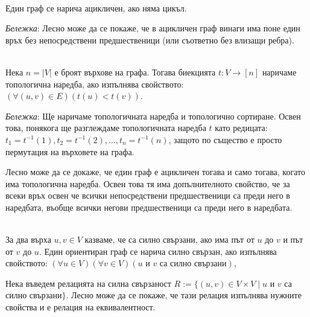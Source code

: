 \documentclass[12pt,twoside,a4paper]{article}
\begin{document}
	\begin{definition}~\\
		\indent Един граф се нарича ацикличен, ако няма цикъл.
		
		\textit{Бележка}: Лесно може да се покаже, че в ацикличен граф винаги има поне един връх без непосредствени предшественици (или съответно без влизащи ребра).
	\end{definition}
	
	\begin{definition}~\\
		\indent Нека $n=|V|$ е броят върхове на графа. Тогава биекцията $t\colon V \to [n]$ наричаме топологична наредба, ако изпълнява свойството: $(\forall (u,v) \in E)(t(u)<t(v))$.
		
		\textit{Бележка}: Ще наричаме топологичната наредба и топологично сортиране. Освен това, понякога ще разглеждаме топологичната наредба $t$ като редицата: $t_1 = t^{-1}(1), t_2 = t^{-1}(2), \dots, t_n = t^{-1}(n)$, защото по същество е просто пермутация на върховете на графа.
	\end{definition}
	
	Лесно може да се докаже, че един граф е ацикличен тогава и само тогава, когато има топологична наредба. Освен това тя има допълнителното свойство, че за всеки връх освен че всички непосредствени предшественици са преди него в наредбата, въобще всички негови предшественици са преди него в наредбата.
	
	\newpage
	\begin{definitions}~\\
		\indent За два върха $u, v \in V$ казваме, че са силно свързани, ако има път от $u$ до $v$ и път от $v$ до $u$. Един ориентиран граф се нарича силно свързан, ако изпълнява свойството: $(\forall u \in V)(\forall v \in V)(u\text{ и }v\text{ са силно свързани})$, 
	\end{definitions}
	
	Нека въведем релацията на силна свързаност $R := \{(u, v) \in V \times V \mid u\text{ и }v$ са силно свързани$\}$. Лесно може да се покаже, че тази релация изпълнява нужните свойства и е релация на еквивалентност.
	
\end{document}
